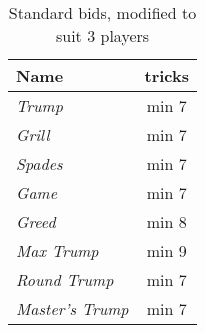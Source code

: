 %
%
%

\begin{table}
	\caption{Standard bids, modified to suit $3$ players}\label{tab:standardBids3}
	\begin{center}
		\begin{tabular}{l|c}
			\textbf{Name} & \textbf{tricks}
			\\ \hline
			\textit{Trump} & min 7 \\
			\textit{Grill} & min 7 \\
			\textit{Spades} & min 7 \\
			\textit{Game} & min 7 \\
			\textit{Greed} & min 8 \\
			\textit{Max Trump} & min 9 \\
			\textit{Round Trump} & min 7 \\
			\textit{Master's Trump} & min 7
		\end{tabular}
	\end{center}
\end{table}
